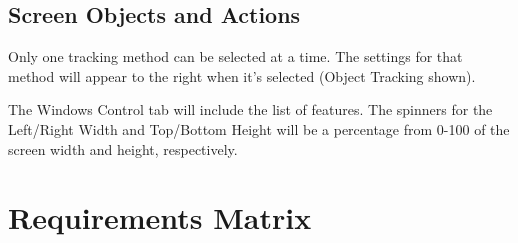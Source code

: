 \documentclass[titlepage]{article}
\begin{document}
\subsection{Screen Objects and Actions}
Only one tracking method can be selected at a time. The settings for that method will appear to the right when it's selected (Object Tracking shown).

The Windows Control tab will include the list of features. The spinners for the Left/Right Width and Top/Bottom Height will be a percentage from 0-100 of the screen width and height, respectively.

\newpage
\section{Requirements Matrix}
\begin{center}
\begin{table}[h]
	\centering
\end{table}
\end{center}
\end{document}
